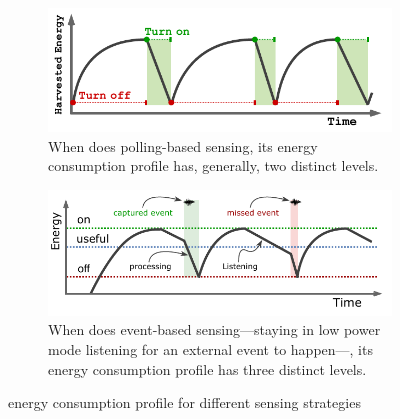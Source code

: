 \begin{figure}[t]
	\centering
		\begin{subfigure}{\columnwidth}
			\includegraphics[width=\columnwidth]{figures/PowerCycleIntermittentSystem}
			\caption{When \sys does polling-based sensing, its energy consumption profile has, generally, two distinct levels.}
			\label{fig:solarPwrCoIS}
	\end{subfigure}
	\begin{subfigure}{\columnwidth}
		\includegraphics[width=\columnwidth]{figures/PowerCycleIntermittentSensor}
		\caption{When \sys does event-based sensing---staying in low power mode listening for an external event to happen---, its energy consumption profile has three distinct levels.}
		\label{fig:solarPwrCoIS}
\end{subfigure}
		\caption{\fullsys energy consumption profile for different sensing strategies}
		\label{fig:cisPwrCycle}
\end{figure} 
%
